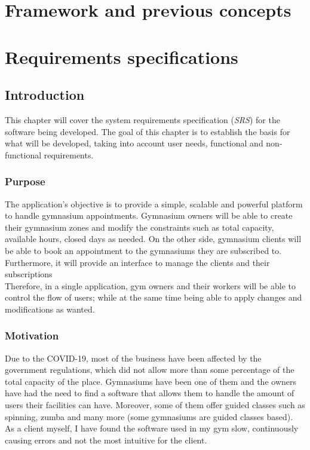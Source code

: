 \documentclass[a4paper,12pt]{book}
\begin{document}
\chapter{Framework and previous concepts}
\chapter{Requirements specifications}
\section{Introduction}
This chapter will cover the system requirements specification (\emph{SRS}) for the software being developed. The goal of this chapter is to establish the basis for what will be developed, taking into account user needs, functional and non-functional requirements.
\subsection{Purpose}
The application's objective is to provide a simple, scalable and powerful platform to handle gymnasium appointments. Gymnasium owners will be able to create their gymnasium zones and modify the constraints such as total capacity, available hours, closed days as needed. On the other side, gymnasium clients will be able to book an appointment to the gymnasiums they are subscribed to.  Furthermore, it will provide an interface to manage the clients and their subscriptions
\\[8pt]
Therefore, in a single application, gym owners and their workers will be able to control the flow of users; while at the same time being able to apply changes and modifications as wanted.
\subsection{Motivation}
Due to the COVID-19, most of the business have been affected by the government regulations, which did not allow more than some percentage of the total capacity of the place. Gymnasiums have been one of them and the owners have had the need to find a software that allows them to handle the amount of users their facilities can have. Moreover, some of them offer guided classes such as spinning, zumba and many more (some gymnasiums are guided classes based).
\\[8pt]
As a client myself, I have found the software used in my gym slow, continuously causing errors and not the most intuitive for the client.
\end{document}

